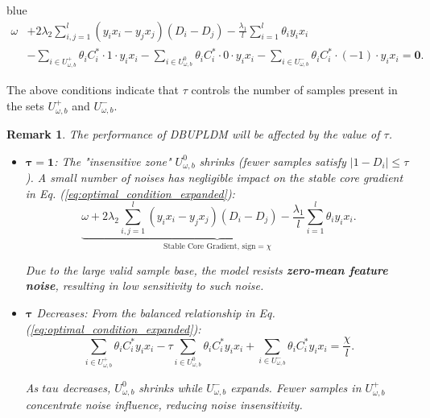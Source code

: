 \documentclass[a4paper]{cas-sc}
\newtheorem{remark}{Remark}
\begin{document}
\begin{color}{blue}
\begin{equation}
\begin{aligned}
\omega &+ 2\lambda_2 \sum_{i,j=1}^{l} (y_i x_i - y_j x_j)(D_i - D_j) - \frac{\lambda_1}{l} \sum_{i=1}^{l} \theta_i y_i x_i \\
&- \sum_{i \in U_{\omega,b}^{+}} \theta_i C_i^* \cdot 1 \cdot y_i x_i 
- \sum_{i \in U_{\omega,b}^{0}} \theta_i C_i^* \cdot 0 \cdot y_i x_i 
- \sum_{i \in U_{\omega,b}^{-}} \theta_i C_i^* \cdot (-1) \cdot y_i x_i = \boldsymbol{0}.
\end{aligned}
\label{eq:optimal_condition_expanded} 
\end{equation}

The above conditions indicate that $\tau$ controls the number of samples present in the sets $U_{\omega,b}^{+}$ and $U_{\omega,b}^{-}$.

\begin{remark}
The performance of DBUPLDM will be affected by the value of $\tau$.
\begin{itemize}
    \item \(\boldsymbol{\tau = 1}\):  
    The "insensitive zone" \(U_{\omega,b}^{0}\) shrinks (fewer samples satisfy \(|1 - D_i| \leq \tau\)). A small number of noises has negligible impact on the \emph{stable core gradient} in Eq. (\ref{eq:optimal_condition_expanded}):  
\begin{equation}
    \underbrace{\omega + 2\lambda_2 \sum_{i,j=1}^l (y_i x_i - y_j x_j)(D_i - D_j) - \frac{\lambda_1}{l} \sum_{i=1}^l \theta_i y_i x_i}_{\text{Stable Core Gradient, sign} = \chi}.
    \label{eq:stable_core_gradient}
\end{equation}  

Due to the large valid sample base, the model resists \textbf{zero-mean feature noise}, resulting in low sensitivity to such noise.  

    \item \(\boldsymbol{\tau}\) Decreases:  
    From the balanced relationship in Eq. (\ref{eq:optimal_condition_expanded}):  
\begin{equation}
    \sum_{i \in U_{\omega,b}^{+}} \theta_i C_i^* y_i x_i - \tau \sum_{i \in U_{\omega,b}^{0}} \theta_i C_i^* y_i x_i + \sum_{i \in U_{\omega,b}^{-}} \theta_i C_i^* y_i x_i = \frac{\chi}{l}.
\label{eq:balanced_relationship}
\end{equation}

As $tau$ decreases, \(U_{\omega,b}^{0}\) shrinks while \(U_{\omega,b}^{-}\) expands. Fewer samples in \(U_{\omega,b}^{+}\) concentrate noise influence, reducing noise insensitivity.  


\end{itemize}
\end{remark}
\end{color}
\end{document}
